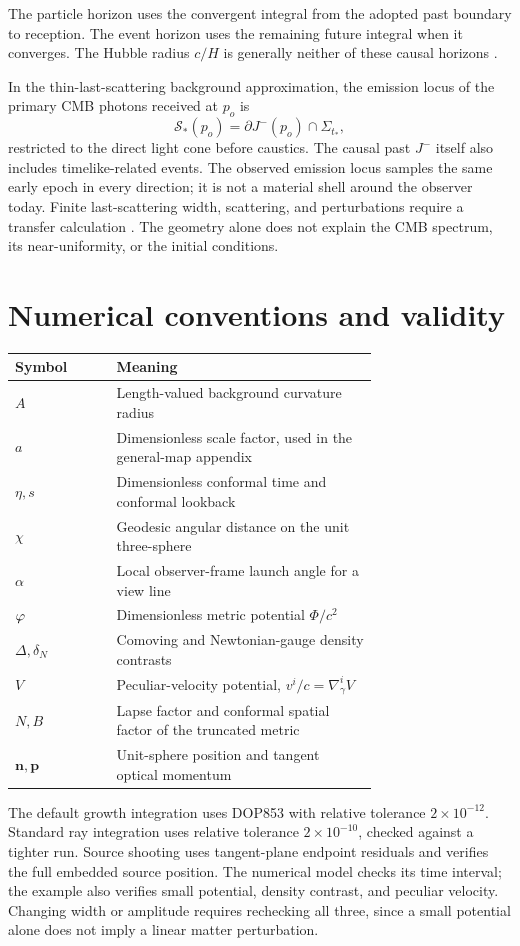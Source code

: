 The particle horizon uses the convergent integral from the adopted past
boundary to reception. The event horizon uses the remaining future
integral when it converges. The Hubble radius $c/H$ is generally neither
of these causal horizons \citep{DavisLineweaver2004}.

In the thin-last-scattering background approximation, the emission
locus of the primary CMB photons received at $p_o$ is
\begin{equation}
 \mathcal S_*(p_o)=\partial J^-(p_o)\cap\Sigma_{t_*},
\end{equation}
restricted to the direct light cone before caustics. The causal past
$J^-$ itself also includes timelike-related events. The observed emission
locus samples the same early epoch in every direction; it is not a
material shell around the observer today. Finite last-scattering width,
scattering, and perturbations require a transfer calculation
\citep{SeljakZaldarriaga1996}. The geometry alone does not explain the
CMB spectrum, its near-uniformity, or the initial conditions.

\section{Numerical conventions and validity}
\begin{table}[htbp]
 \centering\small
 \begin{tabular}{@{}lp{0.72\linewidth}@{}}
 \toprule Symbol & Meaning\\\midrule
 $A$ & Length-valued background curvature radius\\
 $a$ & Dimensionless scale factor, used in the general-map appendix\\
 $\eta,s$ & Dimensionless conformal time and conformal lookback\\
 $\chi$ & Geodesic angular distance on the unit three-sphere\\
 $\alpha$ & Local observer-frame launch angle for a view line\\
 $\varphi$ & Dimensionless metric potential $\Phi/c^2$\\
 $\Delta,\delta_N$ & Comoving and Newtonian-gauge density contrasts\\
 $V$ & Peculiar-velocity potential, $v^i/c=\nabla^i_\gamma V$\\
 $N,B$ & Lapse factor and conformal spatial factor of the truncated metric\\
 $\bm n,\bm p$ & Unit-sphere position and tangent optical momentum\\
 \bottomrule
 \end{tabular}
\end{table}
The default growth integration uses DOP853 with relative tolerance
$2\times10^{-12}$. Standard ray integration uses relative tolerance
$2\times10^{-10}$, checked against a tighter run. Source shooting uses
tangent-plane endpoint residuals and verifies the full embedded source
position. The numerical model checks its time interval; the example
also verifies small potential, density contrast, and peculiar velocity.
Changing width or amplitude requires rechecking all three, since a
small potential alone does not imply a linear matter perturbation.
